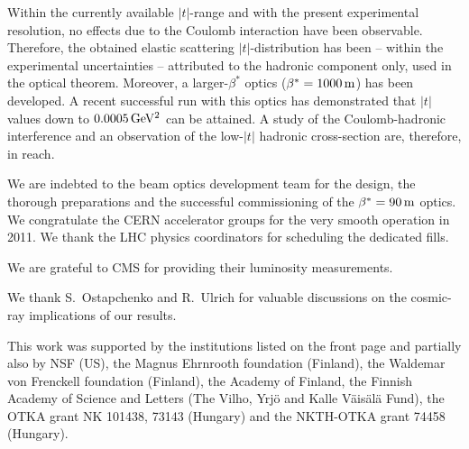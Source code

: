 \documentclass[doublecol]{epl/epl2}
\def\un#1{\,{\rm #1}}
\begin{document}
Within the currently available $|t|$-range and with the present experimental resolution, no effects due to the Coulomb interaction have been observable. Therefore, the obtained elastic scattering $|t|$-distribution has been -- within the experimental uncertainties -- attributed to the hadronic component only, used in the optical theorem. Moreover, a larger-$\beta^*$ optics ($\beta^* = 1000\un{m}$) has been developed. A recent successful run with this optics has demonstrated that $|t|$ values down to $0.0005\un{GeV^2}$ can be attained. A study of the Coulomb-hadronic interference and an observation of the low-$|t|$ hadronic cross-section are, therefore, in reach.

\acknowledgments

We are indebted to the beam optics development team
for the design, the thorough preparations and the successful commissioning of the $\beta^* = 90\un{m}$ optics. We congratulate the CERN accelerator groups for the very smooth operation in 2011. We thank
the LHC physics coordinators for scheduling the dedicated fills.

We are grateful to CMS for providing their luminosity measurements.

We thank S.~Ostapchenko and R.~Ulrich for valuable discussions on the cosmic-ray implications of our results.

This work was supported by the institutions listed on the front page and partially also by NSF (US), the Magnus Ehrnrooth foundation (Finland), the Waldemar von Frenckell foundation (Finland), the Academy of Finland, the Finnish Academy of Science and Letters (The Vilho, Yrj\"o and Kalle V\"ais\"al\"a Fund), the OTKA grant NK 101438, 73143 (Hungary) and the NKTH-OTKA grant 74458 (Hungary).
\end{document}
